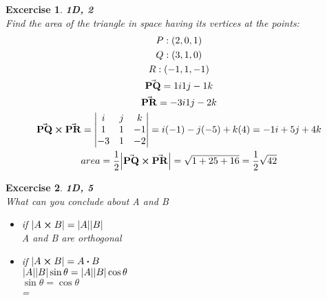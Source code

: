 \documentclass[11pt]{article}
\newtheorem{excercise}{Excercise}
\begin{document}
    \begin{excercise}
        \textbf{1D, 2}\\
        Find the area of the triangle in space having its vertices at the points:
        \begin{gather}
            P:(2, 0, 1)\\
            Q: (3, 1, 0)\\
            R: (-1, 1, -1)\\
            \va{PQ}=1i 1j -1k\\
            \va{PR}=-3i 1j -2k\\
            \va{PQ}\cross\va{PR}
            =\vmqty{
            i & j & k \\
            1 & 1 & -1 \\
            -3 & 1 & -2
            }
            =i(-1) - j(-5) + k(4)= -1i +5j + 4k\\
            area=\frac{1}{2}\abs{\va{PQ} \cross \va{PR}}=\sqrt{1 + 25 + 16}=\frac{1}{2}\sqrt{42}
        \end{gather}
    \end{excercise}

    \begin{excercise}
        \textbf{1D, 5}\\
        What can you conclude about A and B
        \begin{itemize}
            \item if $\abs{A \cross B}=\abs{A}\abs{B}$\\
            A and B are orthogonal
            \item if $\abs{A \cross B}=A\vdot B$\\
            $\abs{A}\abs{B}\sin{\theta}=\abs{A}\abs{B}\cos{\theta}$\\
            $\sin{\theta}=\cos{\theta}$\\
            \theta=

        \end{itemize}
    \end{excercise}
\end{document}
